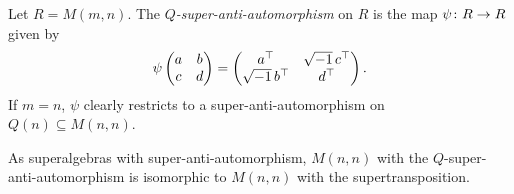 \begin{defi}
	Let $R = M(m,n)$.
	The \emph{$Q$-super-anti-automorphism} on $R$ is the map
	$\psi\colon R \to R$ given by
	\[
		\psi \begin{pmatrix}
			a & b \\
			c & d
		\end{pmatrix} =
		\begin{pmatrix}
			a^{\top}             & \sqrt{-1}\, c^{\top} \\
			\sqrt{-1}\, b^{\top} & d^{\top}
		\end{pmatrix}.
	\]
	If $m = n$, $\psi$ clearly restricts to a super-anti-automorphism on $Q(n) \subseteq M(n,n)$.
\end{defi}

\begin{remark}
	As superalgebras with super-anti-automorphism, $M(n,n)$ with the $Q$-super-anti-automorphism is isomorphic to $M(n,n)$ with the supertransposition.
\end{remark}

